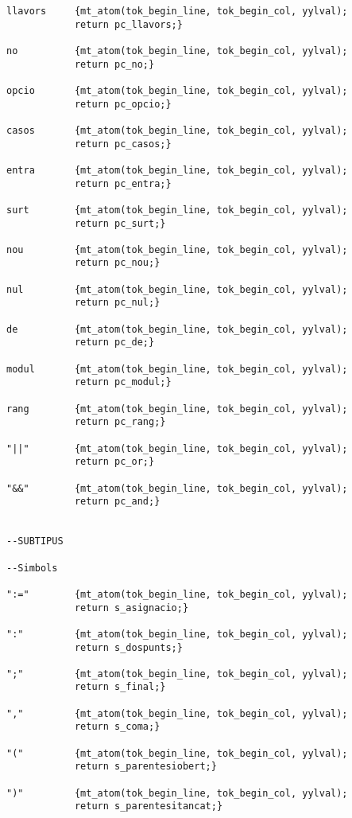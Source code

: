 \documentclass[10pt]{report}
\begin{document}
\begin{lstlisting}
llavors     {mt_atom(tok_begin_line, tok_begin_col, yylval); 
            return pc_llavors;}

no          {mt_atom(tok_begin_line, tok_begin_col, yylval); 
            return pc_no;}

opcio       {mt_atom(tok_begin_line, tok_begin_col, yylval); 
            return pc_opcio;}

casos       {mt_atom(tok_begin_line, tok_begin_col, yylval); 
            return pc_casos;}

entra       {mt_atom(tok_begin_line, tok_begin_col, yylval); 
            return pc_entra;}

surt        {mt_atom(tok_begin_line, tok_begin_col, yylval); 
            return pc_surt;}

nou         {mt_atom(tok_begin_line, tok_begin_col, yylval); 
            return pc_nou;}

nul         {mt_atom(tok_begin_line, tok_begin_col, yylval); 
            return pc_nul;}

de          {mt_atom(tok_begin_line, tok_begin_col, yylval); 
            return pc_de;}

modul       {mt_atom(tok_begin_line, tok_begin_col, yylval); 
            return pc_modul;}

rang        {mt_atom(tok_begin_line, tok_begin_col, yylval); 
            return pc_rang;}

"||"        {mt_atom(tok_begin_line, tok_begin_col, yylval); 
            return pc_or;}

"&&"        {mt_atom(tok_begin_line, tok_begin_col, yylval); 
            return pc_and;}


--SUBTIPUS

--Simbols 

":="        {mt_atom(tok_begin_line, tok_begin_col, yylval); 
            return s_asignacio;}

":"         {mt_atom(tok_begin_line, tok_begin_col, yylval); 
            return s_dospunts;}

";"         {mt_atom(tok_begin_line, tok_begin_col, yylval); 
            return s_final;}

","         {mt_atom(tok_begin_line, tok_begin_col, yylval); 
            return s_coma;}

"("         {mt_atom(tok_begin_line, tok_begin_col, yylval);
            return s_parentesiobert;}

")"         {mt_atom(tok_begin_line, tok_begin_col, yylval);
            return s_parentesitancat;}


\end{lstlisting}
\end{document}
